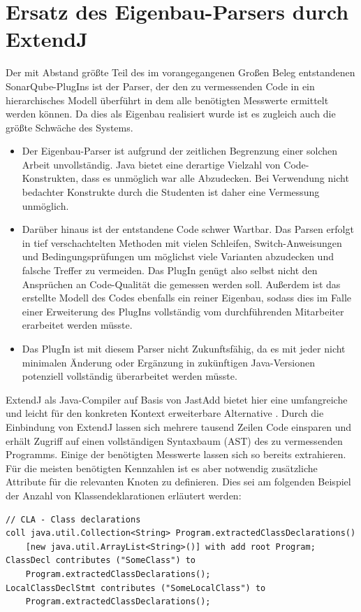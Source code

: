 \documentclass[da,ngerman]{stthesis}
\begin{document}
		\section{Ersatz des Eigenbau-Parsers durch ExtendJ}
			Der mit Abstand größte Teil des im vorangegangenen Großen Beleg entstandenen SonarQube-PlugIns ist der Parser, der den zu vermessenden Code in ein hierarchisches Modell überführt in dem alle benötigten Messwerte ermittelt werden können. Da dies als Eigenbau realisiert wurde ist es zugleich auch die größte Schwäche des Systems. 
			\begin{itemize}
				\item Der Eigenbau-Parser ist aufgrund der zeitlichen Begrenzung einer solchen Arbeit unvollständig. Java bietet eine derartige Vielzahl von Code-Konstrukten, dass es unmöglich war alle Abzudecken. Bei Verwendung nicht bedachter Konstrukte durch die Studenten ist daher eine Vermessung unmöglich.
				\item Darüber hinaus ist der entstandene Code schwer Wartbar. Das Parsen erfolgt in tief verschachtelten Methoden mit vielen Schleifen, Switch-Anweisungen und Bedingungsprüfungen um möglichst viele Varianten abzudecken und falsche Treffer zu vermeiden. Das PlugIn genügt also selbst nicht den Ansprüchen an Code-Qualität die gemessen werden soll. Außerdem ist das erstellte Modell des Codes ebenfalls ein reiner Eigenbau, sodass dies im Falle einer Erweiterung des PlugIns vollständig vom durchführenden Mitarbeiter erarbeitet werden müsste.
				\item Das PlugIn ist mit diesem Parser nicht Zukunftsfähig, da es mit jeder nicht minimalen Änderung oder Ergänzung in zukünftigen Java-Versionen potenziell vollständig überarbeitet werden müsste.
			\end{itemize}
			ExtendJ als Java-Compiler auf Basis von JastAdd bietet hier eine umfangreiche und leicht für den konkreten Kontext erweiterbare Alternative \cite{ExtendJ}. Durch die Einbindung von ExtendJ lassen sich mehrere tausend Zeilen Code einsparen und erhält Zugriff auf einen vollständigen Syntaxbaum (AST) des zu vermessenden Programms. Einige der benötigten Messwerte lassen sich so bereits extrahieren. Für die meisten benötigten Kennzahlen ist es aber notwendig zusätzliche Attribute für die relevanten Knoten zu definieren. Dies sei am folgenden Beispiel der Anzahl von Klassendeklarationen erläutert werden:
			\begin{lstlisting}
// CLA - Class declarations
coll java.util.Collection<String> Program.extractedClassDeclarations()
	[new java.util.ArrayList<String>()] with add root Program;
ClassDecl contributes ("SomeClass") to
	Program.extractedClassDeclarations();
LocalClassDeclStmt contributes ("SomeLocalClass") to
	Program.extractedClassDeclarations();
			\end{lstlisting}
\end{document}
